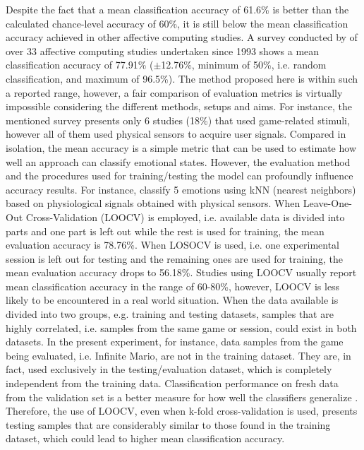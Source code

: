 Despite the fact that a mean classification accuracy of 61.6\% is better than the calculated chance-level accuracy of 60\%, it is still below the mean classification accuracy achieved in other affective computing studies. A survey conducted by \textcite{moghimi2017affective} of over 33 affective computing studies undertaken since 1993 shows a mean classification accuracy of 77.91\% ($\pm$12.76\%, minimum of 50\%, i.e. random classification, and maximum of 96.5\%). The method proposed here is within such a reported range, however, a fair comparison of evaluation metrics is virtually impossible considering the different methods, setups and aims. For instance, the mentioned survey presents only 6 studies (18\%) that used game-related stimuli, however all of them used physical sensors to acquire user signals. Compared in isolation, the mean accuracy is a simple metric that can be used to estimate how well an approach can classify emotional states. However, the evaluation method and the procedures used for training/testing the model can profoundly influence accuracy results. For instance, \textcite{kukolja2014comparative} classify 5 emotions using kNN (nearest neighbors) based on physiological signals obtained with physical sensors. When Leave-One-Out Cross-Validation (LOOCV) is employed, i.e. available data is divided into parts and one part is left out while the rest is used for training, the mean evaluation accuracy is 78.76\%. When LOSOCV is used, i.e. one experimental session is left out for testing and the remaining ones are used for training, the mean evaluation accuracy drops to 56.18\%. Studies using LOOCV usually report mean classification accuracy in the range of 60-80\%, however, LOOCV is less likely to be encountered in a real world situation. When the data available is divided into two groups, e.g. training and testing datasets, samples that are highly correlated, i.e. samples from the same game or session, could exist in both datasets. In the present experiment, for instance, data samples from the game being evaluated, i.e. Infinite Mario, are not in the training dataset. They are, in fact, used exclusively in the testing/evaluation dataset, which is completely independent from the training data. Classification performance on fresh data from the validation set is a better measure for how well the classifiers generalize \parencite[Chapter 5]{james2013introduction}. Therefore, the use of LOOCV, even when k-fold cross-validation is used, presents testing samples that are considerably similar to those found in the training dataset, which could lead to higher mean classification accuracy.

